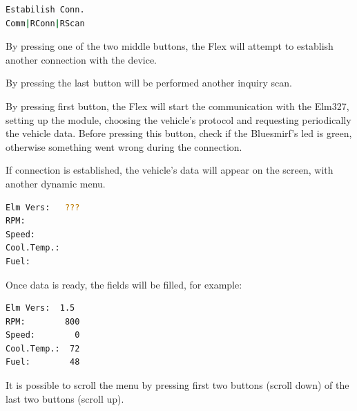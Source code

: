 \documentclass[twoside]{article}
\begin{document}
\begin{multicols}{2}
\begin{lstlisting}[language=bash]
Estabilish Conn.
Comm|RConn|RScan
\end{lstlisting}

By pressing one of the two middle buttons, the Flex will attempt to establish another connection with the device.

By pressing the last button will be performed another inquiry scan.

By pressing first button, the Flex will start the communication with the Elm327, setting up the module, choosing the vehicle's protocol and requesting periodically the vehicle data. Before pressing this button, check if the Bluesmirf's led is green, otherwise something went wrong during the connection.

If connection is established, the vehicle's data will appear on the screen, with another dynamic menu.

\begin{lstlisting}[language=bash]
Elm Vers:   ???
RPM:
Speed:
Cool.Temp.:
Fuel:
\end{lstlisting}

Once data is ready, the fields will be filled, for example:

\begin{lstlisting}[language=bash]
Elm Vers:  1.5
RPM:        800
Speed:        0
Cool.Temp.:  72
Fuel:        48
\end{lstlisting}

It is possible to scroll the menu by pressing first two buttons (scroll down) of the last two buttons (scroll up).






\end{multicols}
\end{document}
